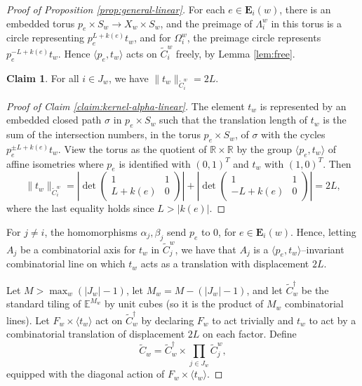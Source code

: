 \documentclass[11pt,oneside]{amsart}
\newcounter{ax}
\theoremstyle{definition}
\newtheorem{claim}{Claim}
\newcommand{\field}[1]{\mathbb{#1}}
\newcommand{\reals}{\ensuremath{\field{R}}}
\newcommand{\Euclidean}{\ensuremath{\field{E}}}
\begin{document}
\begin{proof}[Proof of Proposition \ref{prop:general-linear}]
For each $e\in \mathbf E_i(w)$, there is an embedded torus $p_e\times S_w\to X_w\times S_w$, and the preimage of $\Lambda^w_i$ in this torus is a circle representing $p_e^{L+k(e)}t_w$, and for $\Omega^w_i$, the preimage circle represents $p_e^{-L+k(e)}t_w$.  Hence $\langle p_e,t_w\rangle$ acts on $\widetilde C^w_i$ freely, by Lemma \ref{lem:free}.

\begin{claim}\label{claim:translation-length-linear}
For all $i\in J_w$, we have $\|t_w\|_{\widetilde C^w_i}=2L$.
\end{claim}

\begin{proof}[Proof of Claim \ref{claim:kernel-alpha-linear}]
The element $t_w$ is represented by an embedded closed path $\sigma$ in $p_e\times S_w$ such that the translation length of $t_w$ is the sum of the intersection numbers, in the torus $p_e\times S_w$, of $\sigma$ with the cycles $p_e^{\pm L+k(e)}t_w$.  View the torus as the quotient of $\reals\times \reals$ by the group $\langle p_e,t_w\rangle$ of affine isometries where $p_e$ is identified with $(0,1)^T$ and $t_w$ with $(1,0)^T$.  Then
$$\|t_w\|_{\widetilde C^w_i}=\left|\det\begin{pmatrix}
    1&1\\
    L+k(e)&0
\end{pmatrix}\right|+\left|\det\begin{pmatrix}
    1&1\\
    -L+k(e)&0
\end{pmatrix}\right|=2L,$$
where the last equality holds since $L>|k(e)|$.
\end{proof}


For $j\neq i$, the homomorphisms $\alpha_j,\beta_j$ send $p_e$ to $0$, for $e\in\mathbf E_i(w)$.  Hence, letting $A_j$ be a combinatorial axis for $t_w$ in $\widetilde C^w_j$, we have that $A_j$ is a $\langle p_e,t_w\rangle$--invariant combinatorial line on which $t_w$ acts as a translation with displacement $2L$.

Let $M>\max_w(|J_w|-1)$, let $M_w=M-(|J_w|-1)$, and let $\widetilde C^\dagger_w$ be the standard tiling of $\Euclidean^{M_w}$ by unit cubes (so it is the product of $M_w$ combinatorial lines).  Let $F_w\times \langle t_w\rangle$ act on $\widetilde C^\dagger_w$ by declaring $F_w$ to act trivially and $t_w$ to act by a combinatorial translation of displacement $2L$ on each factor.  Define
$$\widetilde C_w=\widetilde C_w^\dagger\times\prod_{j\in J_w}\widetilde C^w_j,$$
equipped with the diagonal action of $F_w\times \langle t_w\rangle$.


\end{proof}
\end{document}
